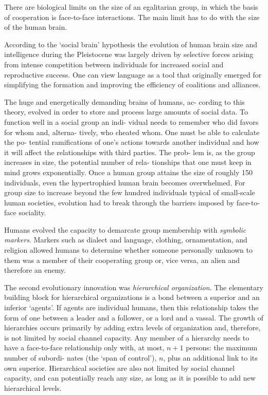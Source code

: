 \documentclass[
]{book}
\begin{document}
There are biological limits on the size of an egalitarian group, in
which the basis of cooperation is face-to-face interactions. The main
limit has to do with the size of the human brain.

According to the `social brain' hypothesis the evolution of
human brain size and intelligence during the Pleistocene was
largely driven by selective forces arising from intense competition
between individuals for increased social and reproductive success.
One can view language as a tool that originally emerged for simplifying
the formation and improving the efficiency of coalitions and alliances.

The huge and energetically demanding brains of humans, ac-
cording to this theory, evolved in order to store and process large
amounts of social data. To function well in a social group an indi-
vidual needs to remember who did favors for whom and, alterna-
tively, who cheated whom. One must be able to calculate the po-
tential ramifications of one's actions towards another individual
and how it will affect the relationships with third parties. The prob-
lem is, as the group increases in size, the potential number of rela-
tionships that one must keep in mind grows exponentially.
Once a human group attains the size of roughly 150 individuals,
even the hypertrophied human brain becomes overwhelmed.
For group size to increase beyond the few hundred
individuals typical of small-scale human societies, evolution had to
break through the barriers imposed by face-to-face sociality.

Humans evolved the capacity to demarcate
group membership with \emph{symbolic markers}.
Markers such as dialect and language, clothing, ornamentation, and religion allowed
humans to determine whether someone personally unknown to
them was a member of their cooperating group or, vice versa,
an alien and therefore an enemy.

The second evolutionary innovation was \emph{hierarchical organization}.
The elementary building block for hierarchical organizations
is a bond between a superior and an inferior `agents'. If agents are
individual humans, then this relationship takes the form of one
between a leader and a follower, or a lord and a vassal. The growth of
hierarchies occurs primarily by adding extra levels of organization
and, therefore, is not limited by social channel capacity. Any
member of a hierarchy needs to have a face-to-face relationship
only with, at most, \(n + 1\) persons: the maximum number of subordi-
nates (the `span of control'), \(n\), plus an additional link to its own
superior.
Hierarchical societies are also
not limited by social channel capacity, and can potentially reach any
size, as long as it is possible to add new hierarchical levels.
\end{document}
